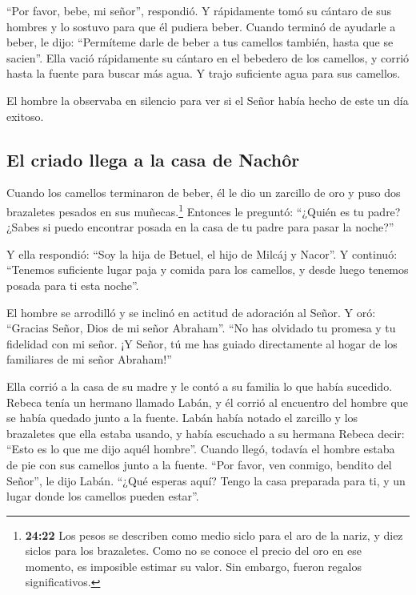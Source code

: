  ``Por favor, bebe, mi señor'', respondió. Y rápidamente
tomó su cántaro de sus hombres y lo sostuvo para que él pudiera beber.
 Cuando terminó de ayudarle a beber, le dijo: ``Permíteme
darle de beber a tus camellos también, hasta que se sacien''.
 Ella vació rápidamente su cántaro en el bebedero de los
camellos, y corrió hasta la fuente para buscar más agua. Y trajo
suficiente agua para sus camellos.

 El hombre la observaba en silencio para ver si el Señor
había hecho de este un día exitoso.

\hypertarget{el-criado-llega-a-la-casa-de-nachuxf4r}{%
\subsection{El criado llega a la casa de
Nachôr}\label{el-criado-llega-a-la-casa-de-nachuxf4r}}

 Cuando los camellos terminaron de beber, él le dio un
zarcillo de oro y puso dos brazaletes pesados en sus muñecas.\footnote{\textbf{24:22}
  Los pesos se describen como medio siclo para el aro de la nariz, y
  diez siclos para los brazaletes. Como no se conoce el precio del oro
  en ese momento, es imposible estimar su valor. Sin embargo, fueron
  regalos significativos.}  Entonces le preguntó:
``¿Quién es tu padre? ¿Sabes si puedo encontrar posada en la casa de tu
padre para pasar la noche?''

 Y ella respondió: ``Soy la hija de Betuel, el hijo de
Milcáj y Nacor''. Y continuó: ``Tenemos suficiente lugar paja y comida
para los camellos,  y desde luego tenemos posada para ti
esta noche''.

 El hombre se arrodilló y se inclinó en actitud de
adoración al Señor.  Y oró: ``Gracias Señor, Dios de mi
señor Abraham''. ``No has olvidado tu promesa y tu fidelidad con mi
señor. ¡Y Señor, tú me has guiado directamente al hogar de los
familiares de mi señor Abraham!''

 Ella corrió a la casa de su madre y le contó a su
familia lo que había sucedido.  Rebeca tenía un hermano
llamado Labán, y él corrió al encuentro del hombre que se había quedado
junto a la fuente.  Labán había notado el zarcillo y los
brazaletes que ella estaba usando, y había escuchado a su hermana Rebeca
decir: ``Esto es lo que me dijo aquél hombre''. Cuando llegó, todavía el
hombre estaba de pie con sus camellos junto a la fuente. 
``Por favor, ven conmigo, bendito del Señor'', le dijo Labán. ``¿Qué
esperas aquí? Tengo la casa preparada para ti, y un lugar donde los
camellos pueden estar''.

